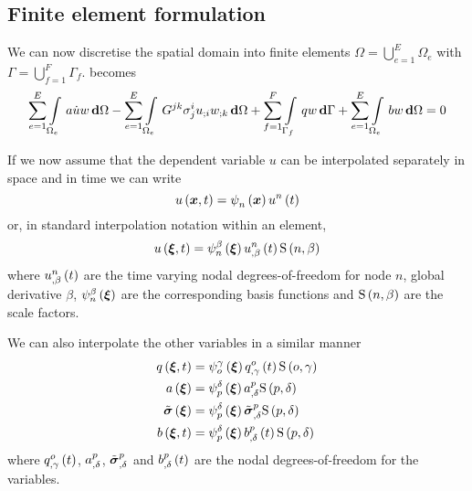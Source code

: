 \subsection{Finite element formulation}

We can now discretise the spatial domain into finite elements \ie $\Omega=
\displaystyle{\bigcup_{e=1}^{E}}\Omega_{e}$ with
$\Gamma=\displaystyle{\bigcup_{f=1}^{F}}\Gamma_{f}$. 
 becomes
\begin{equation}
  \dsum_{e=1}^{E}\gint{\Omega_{e}}{}{a\dot{u}w}{\Omega}-
  \dsum_{e=1}^{E}\gint{\Omega_{e}}{}{G^{jk}\sigma^{i}_{j}
    \covarderiv{u}{i}\covarderiv{w}{k}}{\Omega}+
  \dsum_{f=1}^{F}\gint{\Gamma_{f}}{}{qw}{\Gamma} +
  \dsum_{e=1}^{E}\gint{\Omega_{e}}{}{bw}{\Omega}=0
  \label{eqn:diffusionfemform}
\end{equation}

If we now assume that the dependent variable $u$ can be interpolated
separately in space and in time we can write
\begin{equation}
   u\left( \boldsymbol{x},t \right) =   \psi_{n}^{} \left( \boldsymbol{x} \right)    {u}^{n} \left( t \right) 
\end{equation}
or, in standard interpolation notation within an element,
\begin{equation}
   u\left( \boldsymbol{\xi},t \right) =   \psi_{n}^{\beta} \left( \boldsymbol{\xi} \right)  
     {u}^{n} _{,\beta} \left( t \right)    \mathrm{S} \left( n,\beta \right)  
\end{equation}
where $   {u}^{n} _{,\beta} \left( t \right) $ are the time varying nodal
degrees-of-freedom for node $n$, global derivative $\beta$,
$   \psi_{n}^{\beta} \left( \boldsymbol{\xi} \right)  $ are the corresponding basis functions 
and $   \mathrm{S} \left( n,\beta \right)  $ are the scale factors. 

We can also interpolate the other variables in a similar manner \ie
\begin{equation}
  \begin{split}
     q\left( \boldsymbol{\xi},t \right)  &=    \psi_{o}^{\gamma} \left( \boldsymbol{\xi} \right)  
       {q}^{o} _{,\gamma} \left( t \right)    \mathrm{S} \left( o,\gamma \right)   \\
     a\left( \boldsymbol{\xi} \right)  &=   \psi_{p}^{\delta} \left( \boldsymbol{\xi} \right)  
      {a}^{p} _{,\delta}    \mathrm{S} \left( p,\delta \right)   \\
     \tilde{\boldsymbol{\mathit{\sigma}}}\left( \boldsymbol{\xi} \right) 
    &=   \psi_{p}^{\delta} \left( \boldsymbol{\xi} \right)    {\tilde{\boldsymbol{\mathit{\sigma}}}}^{p} _{,\delta} 
       \mathrm{S} \left( p,\delta \right)   \\
     b\left( \boldsymbol{\xi},t \right)  &=
       \psi_{p}^{\delta} \left( \boldsymbol{\xi} \right)     {b}^{p} _{,\delta} \left( t \right)    \mathrm{S} \left( p,\delta \right)  
  \end{split}
\end{equation}
where $   {q}^{o} _{,\gamma} \left( t \right) $, $  {a}^{p} _{,\delta} $,
$  {\tilde{\boldsymbol{\mathit{\sigma}}}}^{p} _{,\delta} $ and 
$   {b}^{p} _{,\delta} \left( t \right) $ are the
nodal degrees-of-freedom for the variables.

